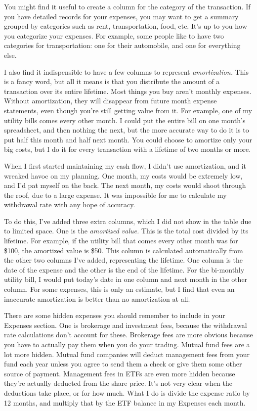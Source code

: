 You might find it useful to create a column for the category of the transaction. If you have detailed records for your expenses, you may want to get a summary grouped by categories such as rent, transportation, food, etc. It's up to you how you categorize your expenses. For example, some people like to have two categories for transportation: one for their automobile, and one for everything else.

I also find it indispensible to have a few columns to represent \emph{amortization.} This is a fancy word, but all it means is that you distribute the amount of a transaction over its entire lifetime. Most things you buy aren't monthly expenses. Without amortization, they will disappear from future month expense statements, even though you're still getting value from it. For example, one of my utility bills comes every other month. I could put the entire bill on one month's spreadsheet, and then nothing the next, but the more accurate way to do it is to put half this month and half next month. You could choose to amortize only your big costs, but I do it for every transaction with a lifetime of two months or more.

When I first started maintaining my cash flow, I didn't use amortization, and it wreaked havoc on my planning. One month, my costs would be extremely low, and I'd pat myself on the back. The next month, my costs would shoot through the roof, due to a large expense. It was impossible for me to calculate my withdrawal rate with any hope of accuracy.

To do this, I've added three extra columns, which I did not show in the table due to limited space. One is the \emph{amortized value.} This is the total cost divided by its lifetime. For example, if the utility bill that comes every other month was for \$100, the amortized value is \$50. This column is calculated automatically from the other two columns I've added, representing the lifetime. One column is the date of the expense and the other is the end of the lifetime. For the bi-monthly utility bill, I would put today's date in one column and next month in the other column. For some expenses, this is only an estimate, but I find that even an inaccurate amortization is better than no amortization at all.

There are some hidden expenses you should remember to include in your Expenses section. One is brokerage and investment fees, because the withdrawal rate calculations don't account for these. Brokerage fees are more obvious because you have to actually pay them when you do your trading. Mutual fund fees are a lot more hidden. Mutual fund companies will deduct management fees from your fund each year unless you agree to send them a check or give them some other source of payment. Management fees in ETFs are even more hidden because they're actually deducted from the share price. It's not very clear when the deductions take place, or for how much. What I do is divide the expense ratio by 12 months, and multiply that by the ETF balance in my Expenses each month.

